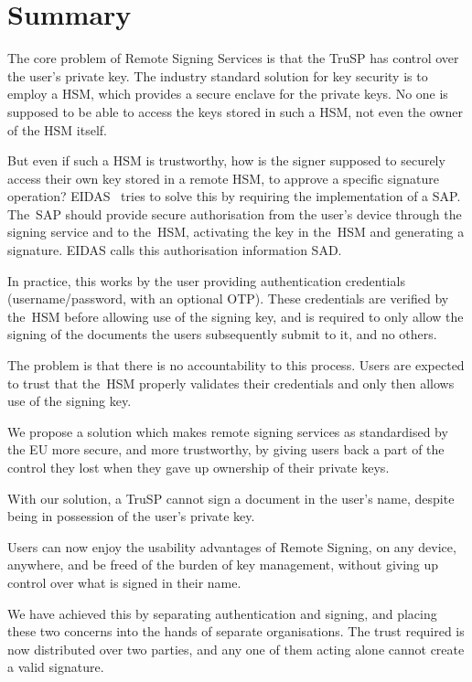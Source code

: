 \chapter*{Summary}
The core problem of Remote Signing Services is that the \gls{TruSP} has control over the user's private key.
The industry standard solution for key security is to employ a \gls{HSM},
which provides a secure enclave for the private keys.
No one is supposed to be able to access the keys stored in such a \gls{HSM},
not even the owner of the \gls{HSM} itself.

But even if such a \gls{HSM} is trustworthy,
how is the signer supposed to securely access their own key stored in a remote \gls{HSM},
to approve a specific signature operation? EIDAS~\cite{eidas} tries to solve this by requiring the implementation of a \gls{SAP}.
The~\gls{SAP} should provide secure authorisation from the user's device through the signing service and to the~\gls{HSM},
activating the key in the~\gls{HSM} and generating a signature.
EIDAS calls this authorisation information \gls{SAD}.

In practice,
this works by the user providing authentication credentials (username/password, with an optional \gls{OTP}).
These credentials are verified by the~\gls{HSM} before allowing use of the signing key,
and is required to only allow the signing of the documents the users subsequently submit to it, and no others.

The problem is that there is no accountability to this process.
Users are expected to trust that the~\gls{HSM} properly validates their credentials and only then
allows use of the signing key.

We propose a solution which makes remote signing services as standardised by the \gls{EU} more secure,
and more trustworthy,
by giving users back a part of the control they lost when they gave up ownership of their private keys.

With our solution,
a \gls{TruSP} cannot sign a document in the user's name,
despite being in possession of the user's private key.

Users can now enjoy the usability advantages of Remote Signing,
on any device, anywhere,
and be freed of the burden of key management,
without giving up control over what is signed in their name.

We have achieved this by separating authentication and signing,
and placing these two concerns into the hands of separate organisations.
The trust required is now distributed over two parties,
and any one of them acting alone cannot create a valid signature.


